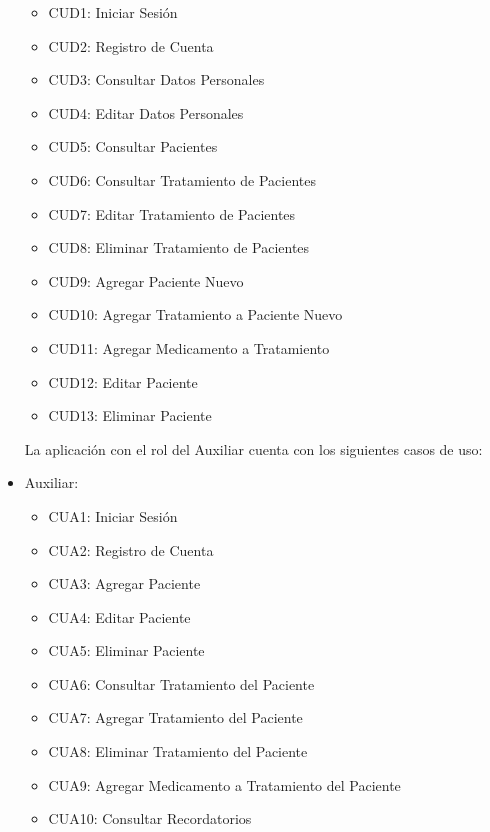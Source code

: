\begin{itemize}
\begin{itemize}
			\item CUD1: Iniciar Sesión
			\item CUD2: Registro de Cuenta
			\item CUD3: Consultar Datos Personales
			\item CUD4: Editar Datos Personales
			\item CUD5: Consultar Pacientes
			\item CUD6: Consultar Tratamiento de Pacientes
			\item CUD7: Editar Tratamiento de Pacientes
			\item CUD8: Eliminar Tratamiento de Pacientes
			\item CUD9: Agregar Paciente Nuevo
			\item CUD10: Agregar Tratamiento a Paciente Nuevo
			\item CUD11: Agregar Medicamento a Tratamiento
			\item CUD12: Editar Paciente
			\item CUD13: Eliminar Paciente
			
		\end{itemize}
	
La aplicación con el rol del Auxiliar cuenta con los siguientes casos de uso:
	
	\item Auxiliar:
		\begin{itemize}
		
			\item CUA1: Iniciar Sesión
			\item CUA2: Registro de Cuenta
			\item CUA3: Agregar Paciente
			\item CUA4: Editar Paciente
			\item CUA5: Eliminar Paciente
			\item CUA6: Consultar Tratamiento del Paciente
			\item CUA7: Agregar Tratamiento del Paciente
			\item CUA8: Eliminar Tratamiento del Paciente
			\item CUA9: Agregar Medicamento a Tratamiento del Paciente
			\item CUA10: Consultar Recordatorios
			
		\end{itemize}
	

	
\end{itemize}
